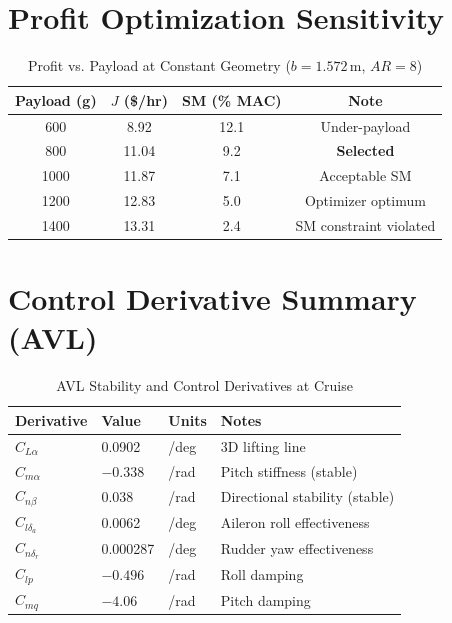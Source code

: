 \documentclass[10pt]{article}
\begin{document}
\appendix
\section{Profit Optimization Sensitivity}

\begin{table}[H]
\centering
\caption{Profit vs. Payload at Constant Geometry ($b = 1.572$\,m, $AR = 8$)}
\small
\begin{tabular}{cccc}
\toprule
Payload (g) & $J$ (\$/hr) & SM (\% MAC) & Note \\
\midrule
600 & 8.92 & 12.1 & Under-payload \\
800 & 11.04 & 9.2 & \textbf{Selected} \\
1000 & 11.87 & 7.1 & Acceptable SM \\
1200 & 12.83 & 5.0 & Optimizer optimum \\
1400 & 13.31 & 2.4 & SM constraint violated \\
\bottomrule
\end{tabular}
\end{table}

\section{Control Derivative Summary (AVL)}

\begin{table}[H]
\centering
\caption{AVL Stability and Control Derivatives at Cruise}
\small
\begin{tabular}{llll}
\toprule
Derivative & Value & Units & Notes \\
\midrule
$C_{L\alpha}$ & 0.0902 & /deg & 3D lifting line \\
$C_{m\alpha}$ & $-0.338$ & /rad & Pitch stiffness (stable) \\
$C_{n\beta}$ & 0.038 & /rad & Directional stability (stable) \\
$C_{l\delta_a}$ & 0.0062 & /deg & Aileron roll effectiveness \\
$C_{n\delta_r}$ & 0.000287 & /deg & Rudder yaw effectiveness \\
$C_{l p}$ & $-0.496$ & /rad & Roll damping \\
$C_{m q}$ & $-4.06$ & /rad & Pitch damping \\
\bottomrule
\end{tabular}
\end{table}
\end{document}
